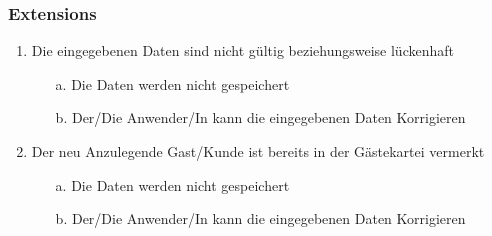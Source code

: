 \documentclass[./detailed_overview_usecases.tex]{subfiles}
\begin{document}
    \subsubsection*{Extensions}
    \begin{enumerate}
        \item Die eingegebenen Daten sind nicht gültig beziehungsweise lückenhaft
        \begin{itemize}
                       \item[a.] Die Daten werden nicht gespeichert
                       \item[b.] Der/Die Anwender/In kann die eingegebenen Daten Korrigieren
        \end{itemize}
        \item Der neu Anzulegende Gast/Kunde ist bereits in der Gästekartei vermerkt
        \begin{itemize}
            \item[a.] Die Daten werden nicht gespeichert
            \item[b.] Der/Die Anwender/In kann die eingegebenen Daten Korrigieren
        \end{itemize}
    \end{enumerate}
\end{document}
